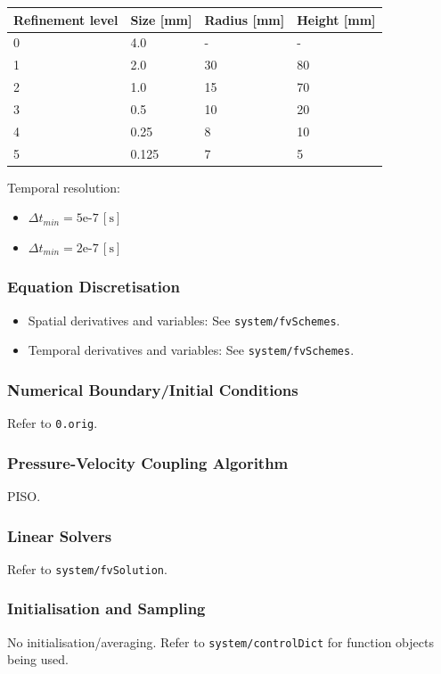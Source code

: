 \begin{center}
\begin{tabular}{llll}
\hline
Refinement level & Size [mm] & Radius [mm] & Height [mm] \\
\hline
0 & 4.0 & - & - \\
1 & 2.0 & 30 & 80 \\
2 & 1.0 & 15 & 70 \\
3 & 0.5 & 10 & 20 \\
4 & 0.25 & 8 & 10 \\
5 & 0.125 & 7 & 5 \\
\hline
\end{tabular}
\end{center}

Temporal resolution:
\begin{itemize}
    \item $\Delta t_{min} = 5\text{e-}7 \, [\mathrm{s}]$
    \item $\Delta t_{min} = 2\text{e-}7 \, [\mathrm{s}]$
\end{itemize}

\subsubsection*{Equation Discretisation}
\begin{itemize}
    \item Spatial derivatives and variables: See \texttt{system/fvSchemes}.
    \item Temporal derivatives and variables: See \texttt{system/fvSchemes}.
\end{itemize}

\subsubsection*{Numerical Boundary/Initial Conditions}
Refer to \texttt{0.orig}.

\subsubsection*{Pressure-Velocity Coupling Algorithm}
PISO.

\subsubsection*{Linear Solvers}
Refer to \texttt{system/fvSolution}.

\subsubsection*{Initialisation and Sampling}
No initialisation/averaging. Refer to \texttt{system/controlDict} for function objects being used.

